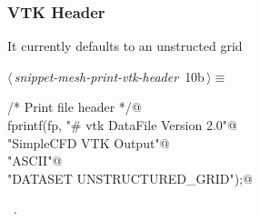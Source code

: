 \documentclass[a4paper,11pt]{article}
\begin{document}
\subsubsection{VTK Header}
It currently defaults to an unstructed grid
\begin{flushleft} \small
\begin{minipage}{\linewidth}\label{scrap10}\raggedright\small
{} $\langle\,${\itshape snippet-mesh-print-vtk-header}\nobreak\ {\footnotesize {10b}}$\,\rangle\equiv$
\vspace{-1ex}
\begin{list}{}{} \item
\mbox{}\verb@/* Print file header */@\\
\mbox{}\verb@    fprintf(fp, "# vtk DataFile Version 2.0\n"@\\
\mbox{}\verb@                "SimpleCFD VTK Output\n"@\\
\mbox{}\verb@                "ASCII\n"@\\
\mbox{}\verb@                "DATASET UNSTRUCTURED_GRID\n");@\\
\mbox{}\verb@@{\NWsep}
\end{list}
\vspace{-1.5ex}
\footnotesize
\begin{list}{}{\setlength{\itemsep}{-\parsep}\setlength{\itemindent}{-\leftmargin}}
\item \NWtxtMacroRefIn\ .

\item{}
\end{list}
\end{minipage}\vspace{4ex}
\end{flushleft}
\end{document}
